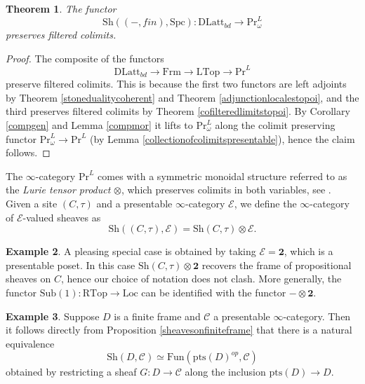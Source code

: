 \documentclass[10pt]{amsart}
\newtheorem{theorem}{Theorem}[section]
\theoremstyle{definition}
\newtheorem{example}[theorem]{Example}
\begin{document}
\begin{theorem} \label{sheavesfiltered}
The functor
$$ \mathrm{Sh}((-,fin),\mathrm{Spc}) : \mathrm{DLatt}_{bd} \rightarrow \mathrm{Pr}^{L}_{\omega} $$
preserves filtered colimits.
\end{theorem}


\begin{proof}
The composite of the functors
$$ \mathrm{DLatt}_{bd} \rightarrow \mathrm{Frm} \rightarrow \mathrm{LTop} \rightarrow \mathrm{Pr}^L$$
preserve filtered colimits. This is because the first two functors are left adjoints by Theorem \ref{stonedualitycoherent} and Theorem \ref{adjunctionlocalestopoi}, and the third preserves filtered colimits by Theorem \ref{cofilteredlimitstopoi}.
By Corollary \ref{compgen} and Lemma \ref{compmor} it lifts to $\mathrm{Pr}^{L}_{\omega}$ along the colimit preserving functor $\mathrm{Pr}^{L}_{\omega} \rightarrow \mathrm{Pr}^L$ (by Lemma \ref{collectionofcolimitspresentable}), hence the claim follows.
\end{proof}

The $\infty$-category $\mathrm{Pr}^L$ comes with a symmetric monoidal structure referred to as the \emph{Lurie tensor product} $\otimes$, which preserves colimits in both variables, see \cite[4.8.1]{lurieha}. Given a site $(C, \tau)$ and a presentable $\infty$-category $\mathcal{E}$, we define the $\infty$-category of $\mathcal{E}$-valued sheaves as
$$\mathrm{Sh}((C, \tau), \mathcal{E}) = \mathrm{Sh}(C, \tau) \otimes \mathcal{E}.$$

\begin{example}
A pleasing special case is obtained by taking $\mathcal{E} = \mathbf{2}$, which is a presentable poset. In this case $\mathrm{Sh}(C, \tau) \otimes \mathbf{2}$ recovers the frame of propositional sheaves on $C$, hence our choice of notation does not clash. More generally, the functor $\mathrm{Sub}(1) : \mathrm{RTop} \rightarrow \mathrm{Loc}$ can be identified with the functor $- \otimes \mathbf{2}$.
\end{example}

\begin{example} \label{sheavesfiniteframepresentable}
Suppose $D$ is a finite frame and $\mathcal{C}$ a presentable $\infty$-category. Then it follows directly from Proposition \ref{sheavesonfiniteframe} that there is a natural equivalence
$$\mathrm{Sh}(D, \mathcal{C}) \simeq \mathrm{Fun}( \mathrm{pts}(D)^{op}, \mathcal{C} )$$
obtained by restricting a sheaf $G : D \rightarrow \mathcal{C}$ along the inclusion $\mathrm{pts}(D) \rightarrow D$.
\end{example}
\end{document}
